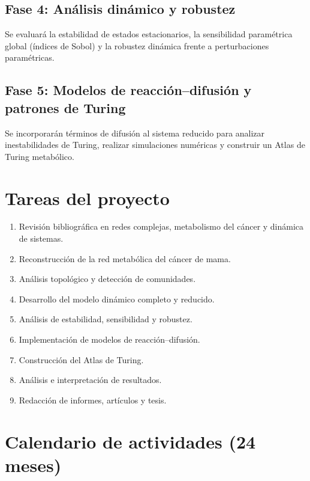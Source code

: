 \documentclass[12pt,spanish]{article}
\begin{document}
	\subsection{Fase 4: Análisis dinámico y robustez}
	
	Se evaluará la estabilidad de estados estacionarios, la sensibilidad paramétrica global (índices de Sobol) y la robustez dinámica frente a perturbaciones paramétricas.
	
	\subsection{Fase 5: Modelos de reacción--difusión y patrones de Turing}
	
	Se incorporarán términos de difusión al sistema reducido para analizar inestabilidades de Turing, realizar simulaciones numéricas y construir un Atlas de Turing metabólico.
	
	\section{Tareas del proyecto}
	
	\begin{enumerate}
		\item Revisión bibliográfica en redes complejas, metabolismo del cáncer y dinámica de sistemas.
		\item Reconstrucción de la red metabólica del cáncer de mama.
		\item Análisis topológico y detección de comunidades.
		\item Desarrollo del modelo dinámico completo y reducido.
		\item Análisis de estabilidad, sensibilidad y robustez.
		\item Implementación de modelos de reacción--difusión.
		\item Construcción del Atlas de Turing.
		\item Análisis e interpretación de resultados.
		\item Redacción de informes, artículos y tesis.
	\end{enumerate}
	
	\section{Calendario de actividades (24 meses)}
	
\end{document}
